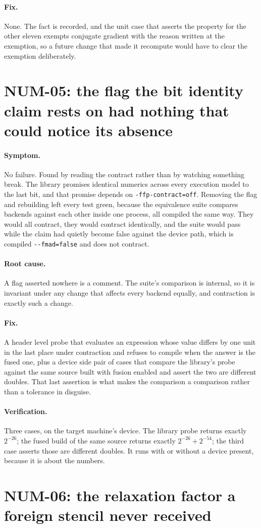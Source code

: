 \documentclass[11pt,a4paper]{report}
\newcommand{\symptom}[1]{\paragraph{Symptom.}#1}
\newcommand{\rootcause}[1]{\paragraph{Root cause.}#1}
\newcommand{\fix}[1]{\paragraph{Fix.}#1}
\newcommand{\verification}[1]{\paragraph{Verification.}#1}
\begin{document}
\fix{None. The fact is recorded, and the unit case that asserts the property for
the other eleven exempts conjugate gradient with the reason written at the
exemption, so a future change that made it recompute would have to clear the
exemption deliberately.}

\section{NUM-05: the flag the bit identity claim rests on had nothing that could notice its absence}

\symptom{No failure. Found by reading the contract rather than by watching
something break. The library promises identical numerics across every execution
model to the last bit, and that promise depends on \texttt{-ffp-contract=off}.
Removing the flag and rebuilding left every test green, because the equivalence
suite compares backends against each other inside one process, all compiled the
same way. They would all contract, they would contract identically, and the suite
would pass while the claim had quietly become false against the device path,
which is compiled \texttt{-{}-fmad=false} and does not contract.}

\rootcause{A flag asserted nowhere is a comment. The suite's comparison is
internal, so it is invariant under any change that affects every backend equally,
and contraction is exactly such a change.}

\fix{A header level probe that evaluates an expression whose value differs by one
unit in the last place under contraction and refuses to compile when the answer
is the fused one, plus a device side pair of cases that compare the library's
probe against the same source built with fusion enabled and assert the two are
different doubles. That last assertion is what makes the comparison a comparison
rather than a tolerance in disguise.}

\verification{Three cases, on the target machine's device. The library probe
returns exactly $2^{-26}$; the fused build of the same source returns exactly
$2^{-26} + 2^{-54}$; the third case asserts those are different doubles. It runs
with or without a device present, because it is about the numbers.}

\section{NUM-06: the relaxation factor a foreign stencil never received}
\end{document}

